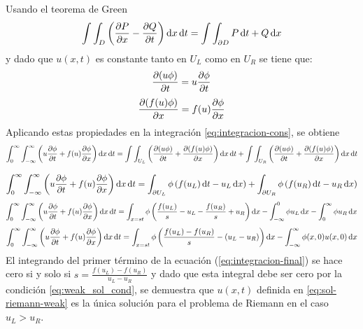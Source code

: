 \documentclass[12pt]{article}
\begin{document}
	Usando el teorema de Green
	\begin{equation}
		\int\int_{D} \left(\pdv{P}{x} -\pdv{Q}{t}\right)\dd{x}\dd{t} = \int\int_{\partial D} P\dd{t} + Q\dd{x}
	\end{equation}
	y dado que $u(x,t)$ es constante tanto en $U_L$ como en $U_R$ se tiene que:
	\begin{equation}
		\pdv{(u\phi)}{t} = u\pdv{\phi}{t} 
	\end{equation}
	\begin{equation}
		\pdv{(f(u)\phi)}{x} = f(u)\pdv{\phi}{x} 
	\end{equation}	
	Aplicando estas propiedades en la integración \ref{eq:integracion-cons}, se obtiene
	\begin{equation}
		\int_{0}^{\infty}\int_{-\infty}^{\infty}\left( u\pdv{\phi}{t} + f(u)\pdv{\phi}{x}\right)\dd{x}\dd{t} = \int\int_{U_L}\left( \pdv{(u\phi)}{t} + \pdv{(f(u)\phi)}{x}\right)\dd{x}\dd{t} + \int\int_{U_R}\left( \pdv{(u\phi)}{t} + \pdv{(f(u)\phi)}{x}\right)\dd{x}\dd{t}
	\end{equation}

	\begin{equation}
		\int_{0}^{\infty}\int_{-\infty}^{\infty}\left( u\pdv{\phi}{t} + f(u)\pdv{\phi}{x}\right)\dd{x}\dd{t}=\int_{\partial U_L}\phi \left( f(u_L)\dd{t} - u_L \dd{x}\right) + \int_{\partial U_R}\phi \left( f(u_R)\dd{t} - u_R \dd{x}\right)
	\end{equation}
	\begin{equation}
		\int_{0}^{\infty}\int_{-\infty}^{\infty}\left( u\pdv{\phi}{t} + f(u)\pdv{\phi}{x}\right)\dd{x}\dd{t}=\int_{x=st}\phi \left(\frac{f(u_L)}{s} - u_L  - \frac{f(u_R)}{s} + u_R  \right)\dd{x}-\int_{-\infty}^{0}\phi u_L \dd{x} -\int_{0}^{\infty}\phi u_R \dd{x}
	\end{equation}
	\begin{equation}
		\int_{0}^{\infty}\int_{-\infty}^{\infty}\left( u\pdv{\phi}{t} + f(u)\pdv{\phi}{x}\right)\dd{x}\dd{t}=\int_{x=st}\phi \left(\frac{f(u_L)-f(u_R)}{s} - (u_L-u_R) \right)\dd{x} - \int_{-\infty}^{\infty}\phi(x,0)u(x,0) \dd{x}
		\label{eq:integracion-final}
	\end{equation}
	El integrando del primer término de la ecuación (\ref{eq:integracion-final}) se hace cero si y solo si $s = \frac{f(u_L) - f(u_R)}{u_L - u_R}$ y dado que esta integral debe ser cero por la condición \ref{eq:weak_sol_cond}, se demuestra que $u(x,t)$ definida en \ref{eq:sol-riemann-weak} es la única solución para el problema de Riemann en el caso $u_L > u_R$.
	
\end{document}
